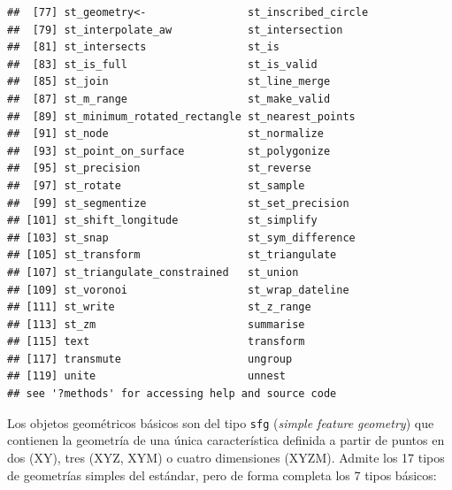 \documentclass[
]{book}
\theoremstyle{break}
\theoremstyle{definition}
\theoremstyle{definition}
\theoremstyle{definition}
\theoremstyle{definition}
\theoremstyle{remark}
\begin{document}
\begin{verbatim}
##  [77] st_geometry<-                st_inscribed_circle         
##  [79] st_interpolate_aw            st_intersection             
##  [81] st_intersects                st_is                       
##  [83] st_is_full                   st_is_valid                 
##  [85] st_join                      st_line_merge               
##  [87] st_m_range                   st_make_valid               
##  [89] st_minimum_rotated_rectangle st_nearest_points           
##  [91] st_node                      st_normalize                
##  [93] st_point_on_surface          st_polygonize               
##  [95] st_precision                 st_reverse                  
##  [97] st_rotate                    st_sample                   
##  [99] st_segmentize                st_set_precision            
## [101] st_shift_longitude           st_simplify                 
## [103] st_snap                      st_sym_difference           
## [105] st_transform                 st_triangulate              
## [107] st_triangulate_constrained   st_union                    
## [109] st_voronoi                   st_wrap_dateline            
## [111] st_write                     st_z_range                  
## [113] st_zm                        summarise                   
## [115] text                         transform                   
## [117] transmute                    ungroup                     
## [119] unite                        unnest                      
## see '?methods' for accessing help and source code
\end{verbatim}

Los objetos geométricos básicos son del tipo \texttt{sfg} (\emph{simple feature geometry}) que contienen la geometría de una única característica definida a partir de puntos en dos (XY), tres (XYZ, XYM) o cuatro dimensiones (XYZM).
Admite los 17 tipos de geometrías simples del estándar, pero de forma completa los 7 tipos básicos:
\end{document}
